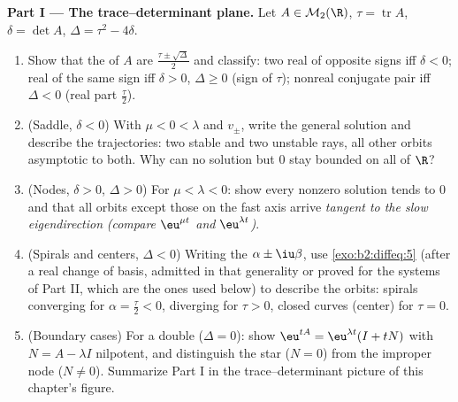 \begin{problem}
\medskip
\noindent\textbf{Part I --- The trace--determinant plane.} Let
$A \in \mathcal M_2(\R)$, $\tau = \operatorname{tr}A$, $\delta
= \det A$, $\Delta = \tau^2 - 4\delta$.
\begin{enumerate}
  \item Show that the  of $A$ are
        $\frac{\tau\pm\sqrt\Delta}{2}$ and classify: two real
         of opposite signs iff $\delta < 0$; real
         of the same sign iff $\delta > 0$, $\Delta
        \geq 0$ (sign of $\tau$); nonreal conjugate pair iff
        $\Delta < 0$ (real part $\frac\tau2$).
  \item (Saddle, $\delta < 0$) With  $\mu < 0 <
        \lambda$ and  $v_\pm$, write the general
        solution and describe the trajectories: two stable and
        two unstable rays, all other orbits asymptotic to
        both. Why can no solution but $0$ stay bounded on all
        of $\R$?
  \item (Nodes, $\delta > 0$, $\Delta > 0$) For $\mu < \lambda
        < 0$: show every nonzero solution tends to $0$ and
        that all orbits except those on the fast axis arrive
        \emph{tangent to the slow eigendirection}
        \emph{(compare $\eu^{\mu t}$ and $\eu^{\lambda t}$)}.
  \item (Spirals and centers, $\Delta < 0$) Writing the
         $\alpha \pm \iu\beta$, use
        \cref{exo:b2:diffeq:5} (after a real change of basis,
        admitted in that generality or proved for the systems
        of Part II, which are the ones used below) to describe
        the orbits: spirals converging for $\alpha =
        \frac\tau2 < 0$, diverging for $\tau > 0$, closed
        curves (center) for $\tau = 0$.
  \item (Boundary cases) For a double  ($\Delta =
        0$): show $\eu^{tA} = \eu^{\lambda t}(I + tN)$ with $N
        = A - \lambda I$ nilpotent, and distinguish the star
        ($N = 0$) from the improper node ($N \neq 0$).
        Summarize Part I in the trace--determinant picture of
        this chapter's figure.
\end{enumerate}


\end{problem}
